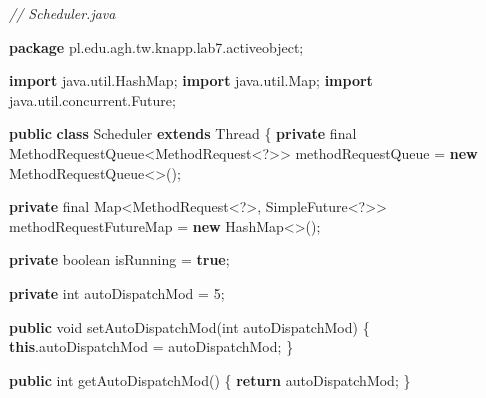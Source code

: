 \documentclass[11pt]{article}
\newenvironment{Shaded}{}{}
\newcommand{\KeywordTok}[1]{\textcolor[rgb]{0.00,0.44,0.13}{\textbf{{#1}}}}
\newcommand{\DataTypeTok}[1]{\textcolor[rgb]{0.56,0.13,0.00}{{#1}}}
\newcommand{\DecValTok}[1]{\textcolor[rgb]{0.25,0.63,0.44}{{#1}}}
\newcommand{\CommentTok}[1]{\textcolor[rgb]{0.38,0.63,0.69}{\textit{{#1}}}}
\newcommand{\FunctionTok}[1]{\textcolor[rgb]{0.02,0.16,0.49}{{#1}}}
\newcommand{\NormalTok}[1]{{#1}}
\newcommand{\ImportTok}[1]{{#1}}
\newcommand{\ControlFlowTok}[1]{\textcolor[rgb]{0.00,0.44,0.13}{\textbf{{#1}}}}
\newcommand{\OperatorTok}[1]{\textcolor[rgb]{0.40,0.40,0.40}{{#1}}}
\newcommand{\BuiltInTok}[1]{{#1}}
\begin{document}
\begin{Shaded}
\begin{Highlighting}[]
\CommentTok{// Scheduler.java}

\KeywordTok{package}\ImportTok{ pl}\OperatorTok{.}\ImportTok{edu}\OperatorTok{.}\ImportTok{agh}\OperatorTok{.}\ImportTok{tw}\OperatorTok{.}\ImportTok{knapp}\OperatorTok{.}\ImportTok{lab7}\OperatorTok{.}\ImportTok{activeobject}\OperatorTok{;}

\KeywordTok{import} \ImportTok{java}\OperatorTok{.}\ImportTok{util}\OperatorTok{.}\ImportTok{HashMap}\OperatorTok{;}
\KeywordTok{import} \ImportTok{java}\OperatorTok{.}\ImportTok{util}\OperatorTok{.}\ImportTok{Map}\OperatorTok{;}
\KeywordTok{import} \ImportTok{java}\OperatorTok{.}\ImportTok{util}\OperatorTok{.}\ImportTok{concurrent}\OperatorTok{.}\ImportTok{Future}\OperatorTok{;}

\KeywordTok{public} \KeywordTok{class}\NormalTok{ Scheduler }\KeywordTok{extends} \BuiltInTok{Thread} \OperatorTok{\{}
    \KeywordTok{private} \DataTypeTok{final}\NormalTok{ MethodRequestQueue}\OperatorTok{\textless{}}\NormalTok{MethodRequest}\OperatorTok{\textless{}?\textgreater{}\textgreater{}}\NormalTok{ methodRequestQueue }\OperatorTok{=}
        \KeywordTok{new}\NormalTok{ MethodRequestQueue}\OperatorTok{\textless{}\textgreater{}();}

    \KeywordTok{private} \DataTypeTok{final} \BuiltInTok{Map}\OperatorTok{\textless{}}\NormalTok{MethodRequest}\OperatorTok{\textless{}?\textgreater{},}\NormalTok{ SimpleFuture}\OperatorTok{\textless{}?\textgreater{}\textgreater{}}\NormalTok{ methodRequestFutureMap }\OperatorTok{=}
        \KeywordTok{new} \BuiltInTok{HashMap}\OperatorTok{\textless{}\textgreater{}();}

    \KeywordTok{private} \DataTypeTok{boolean}\NormalTok{ isRunning }\OperatorTok{=} \KeywordTok{true}\OperatorTok{;}

    \KeywordTok{private} \DataTypeTok{int}\NormalTok{ autoDispatchMod }\OperatorTok{=} \DecValTok{5}\OperatorTok{;}

    \KeywordTok{public} \DataTypeTok{void} \FunctionTok{setAutoDispatchMod}\OperatorTok{(}\DataTypeTok{int}\NormalTok{ autoDispatchMod}\OperatorTok{)} \OperatorTok{\{}
        \KeywordTok{this}\OperatorTok{.}\FunctionTok{autoDispatchMod} \OperatorTok{=}\NormalTok{ autoDispatchMod}\OperatorTok{;}
    \OperatorTok{\}}

    \KeywordTok{public} \DataTypeTok{int} \FunctionTok{getAutoDispatchMod}\OperatorTok{()} \OperatorTok{\{}
        \ControlFlowTok{return}\NormalTok{ autoDispatchMod}\OperatorTok{;}
    \OperatorTok{\}}


\end{Highlighting}
\end{Shaded}
\end{document}
